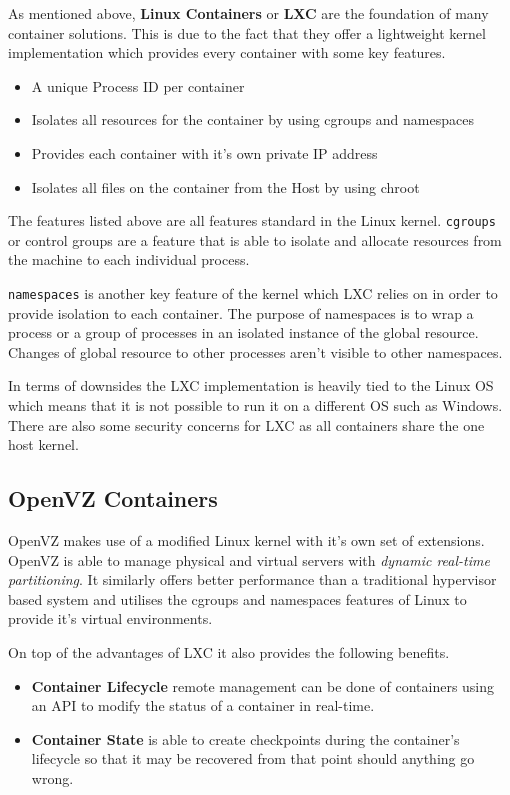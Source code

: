 As mentioned above, \textbf{Linux Containers} or \textbf{LXC} are the foundation of many container solutions. This is due to the fact that they offer a lightweight kernel implementation which provides every container with some key features.

\begin{itemize}
    \item A unique Process ID per container
    \item Isolates all resources for the container by using cgroups and namespaces
    \item Provides each container with it's own private IP address
    \item Isolates all files on the container from the Host by using chroot
\end{itemize}

The features listed above are all features standard in the Linux kernel. \texttt{cgroups} \cite{cgroups-man} or control groups are a feature that is able to isolate and allocate resources from the machine to each individual process. 

\texttt{namespaces} \cite{namespaces-man} is another key feature of the kernel which LXC relies on in order to provide isolation to each container. The purpose of namespaces is to wrap a process or a group of processes in an isolated instance of the global resource. Changes of global resource to other processes aren't visible to other namespaces.

In terms of downsides the LXC implementation is heavily tied to the Linux OS which means that it is not possible to run it on a different OS such as Windows. There are also some security concerns for LXC as all containers share the one host kernel.

\subsection{OpenVZ Containers}

OpenVZ makes use of a modified Linux kernel with it's own set of extensions. OpenVZ is able to manage physical and virtual servers with \textit{dynamic real-time partitioning}. It similarly offers better performance than a traditional hypervisor based system and utilises the cgroups and namespaces features of Linux to provide it's virtual environments.

On top of the advantages of LXC it also provides the following benefits.

\begin{itemize}
    \item \textbf{Container Lifecycle} remote management can be done of containers using an API to modify the status of a container in real-time. 
    \item \textbf{Container State} is able to create checkpoints during the container's lifecycle so that it may be recovered from that point should anything go wrong.
\end{itemize}

